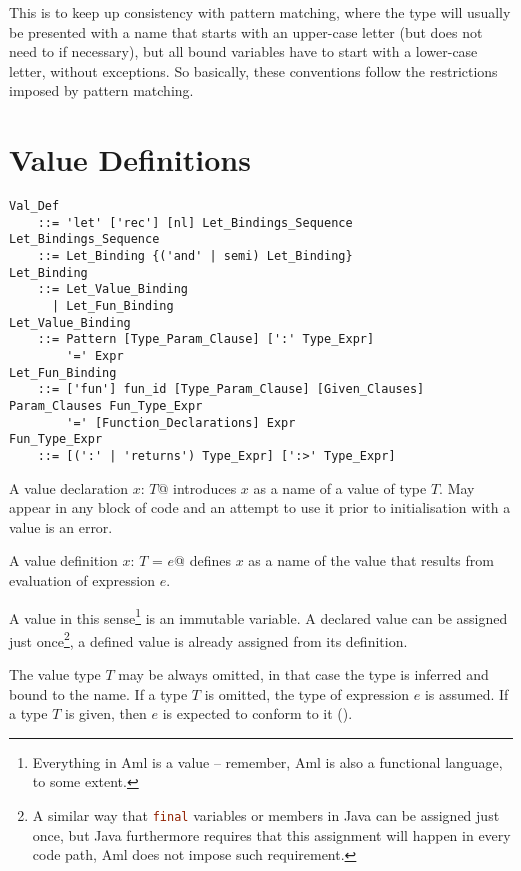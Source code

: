 This is to keep up consistency with pattern matching, where the type will usually be presented with a name that starts with an upper-case letter (but does not need to if necessary), but all bound variables have to start with a lower-case letter, without exceptions. So basically, these conventions follow the restrictions imposed by pattern matching. 





\section{Value Definitions}
\label{sec:value-def}

\grammar\begin{lstlisting}
Val_Def 
    ::= 'let' ['rec'] [nl] Let_Bindings_Sequence
Let_Bindings_Sequence
    ::= Let_Binding {('and' | semi) Let_Binding}
Let_Binding
    ::= Let_Value_Binding
      | Let_Fun_Binding
Let_Value_Binding
    ::= Pattern [Type_Param_Clause] [':' Type_Expr]
        '=' Expr
Let_Fun_Binding
    ::= ['fun'] fun_id [Type_Param_Clause] [Given_Clauses] Param_Clauses Fun_Type_Expr
        '=' [Function_Declarations] Expr
Fun_Type_Expr
    ::= [(':' | 'returns') Type_Expr] [':>' Type_Expr]
\end{lstlisting}

A value declaration \lstinline@let $x$: $T$@ introduces $x$ as a name of a value of type $T$. May appear in any block of code and an attempt to use it prior to initialisation with a value is an error.

A value definition \lstinline@let $x$: $T$ = $e$@ defines $x$ as a name of the value that results from evaluation of expression $e$.

A value in this sense\footnote{Everything in Aml is a value -- remember, Aml is also a functional language, to some extent.} is an immutable variable. A declared value can be assigned just once\footnote{A similar way that \lstinline[language=Java]@final@ variables or members in Java can be assigned just once, but Java furthermore requires that this assignment will happen in every code path, Aml does not impose such requirement.}, a defined value is already assigned from its definition. 

The value type $T$ may be always omitted, in that case the type is inferred and bound to the name. If a type $T$ is omitted, the type of expression $e$ is assumed. If a type $T$ is given, then $e$ is expected to conform to it (). 

